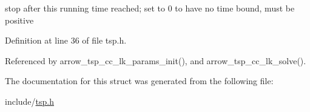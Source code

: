 stop after this running time reached; set to 0 to have no time bound, must be positive 

Definition at line 36 of file tsp.h.

Referenced by arrow\_\-tsp\_\-cc\_\-lk\_\-params\_\-init(), and arrow\_\-tsp\_\-cc\_\-lk\_\-solve().

The documentation for this struct was generated from the following file:\begin{CompactItemize}
\item 
include/\hyperlink{tsp_8h}{tsp.h}\end{CompactItemize}
